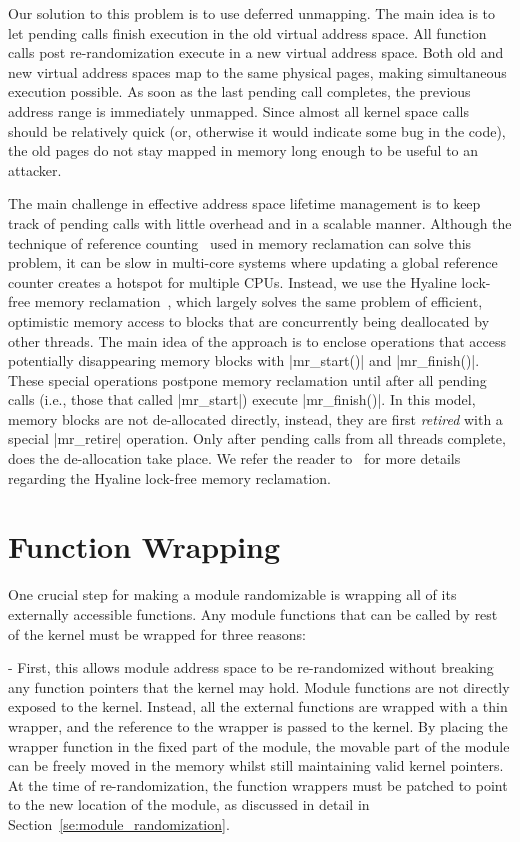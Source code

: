 Our solution to this problem is to use deferred unmapping. The main idea
is to let pending calls finish execution in the old virtual address space. All function calls post re-randomization execute in a new virtual address space. Both old and new virtual address spaces map to the same physical pages, making simultaneous execution possible. As soon as the last pending call completes, the previous address range is immediately unmapped. Since almost all
kernel space calls should be relatively quick (or, otherwise it 
would indicate some bug in the code), the old pages do not stay mapped in memory long enough to be useful to an attacker.

The main challenge in effective address space lifetime management is to keep track of pending calls with little
overhead and in a scalable manner. Although the technique of reference counting~\cite{LFRC} used in memory reclamation can solve this problem, it can be slow in multi-core systems where updating a global
reference counter creates a hotspot for multiple CPUs. Instead,
we use the Hyaline lock-free memory reclamation~\cite{nikolaev2019hyaline}, which largely solves the same problem of efficient, optimistic memory access to blocks that are concurrently being deallocated by other threads. The main idea of the approach is to enclose operations that access potentially disappearing memory blocks with |mr_start()| and |mr_finish()|.
These special operations postpone memory reclamation until after all pending calls (i.e., those that
called |mr_start|) execute |mr_finish()|.
In this model, memory blocks are not de-allocated directly, instead, they are first \textit{retired} with
a special |mr_retire| operation. Only after pending calls from all threads complete, does the de-allocation take place. We refer the reader to~\cite{nikolaev2019hyaline} for more details regarding the Hyaline lock-free memory reclamation.

\section{Function Wrapping}
\label{se:function_wrapping}
One crucial step for making a module randomizable is wrapping all of its externally accessible functions. Any module functions that can be called by rest of the kernel must be wrapped for three reasons:

- First, this allows module address space to be re-randomized without breaking any function pointers that the kernel may hold. Module functions are not directly exposed to the kernel. Instead, all the external functions are wrapped with a thin wrapper, and the reference to the wrapper is passed to the kernel. By placing the wrapper function in the fixed part of the module, the movable part of the module can be freely moved in the memory whilst still maintaining valid kernel pointers. At the time of re-randomization, the function wrappers must be patched to point to the new location of the module, as discussed in detail in Section~\ref{se:module_randomization}.

